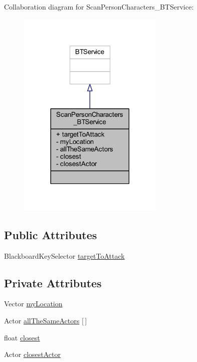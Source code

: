 Collaboration diagram for Scan\+Person\+Characters\+\_\+\+B\+T\+Service\+:\nopagebreak
\begin{figure}[H]
\begin{center}
\leavevmode
\includegraphics[width=197pt]{class_scan_person_characters___b_t_service__coll__graph}
\end{center}
\end{figure}
\subsection*{Public Attributes}
\begin{DoxyCompactItemize}
\item 
Blackboard\+Key\+Selector \hyperlink{class_scan_person_characters___b_t_service_a9c34e715ea6da29e92ca7001672c9115}{target\+To\+Attack}
\end{DoxyCompactItemize}
\subsection*{Private Attributes}
\begin{DoxyCompactItemize}
\item 
Vector \hyperlink{class_scan_person_characters___b_t_service_a10ae41992fbbf06fe2c12af19d65fbd9}{my\+Location}
\item 
Actor \hyperlink{class_scan_person_characters___b_t_service_ab4cebfb967515e3be3752350e270254f}{all\+The\+Same\+Actors} \mbox{[}$\,$\mbox{]}
\item 
float \hyperlink{class_scan_person_characters___b_t_service_a3ac0ee90b48bc64bb65a64f28aaa14a9}{closest}
\item 
Actor \hyperlink{class_scan_person_characters___b_t_service_afc2312ea58e9f0e017001c6ad46321f2}{closest\+Actor}
\end{DoxyCompactItemize}


